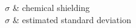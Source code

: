 \documentclass[a4paper, 12pt]{Thesis}  %
\begin{document}

\clearpage  %
{
$\sigma$ & chemical shielding\\
$\sigma$ & estimated standard deviation\\
}

\clearpage

\mainmatter	  %
\pagestyle{fancy}  %












\end{document}

